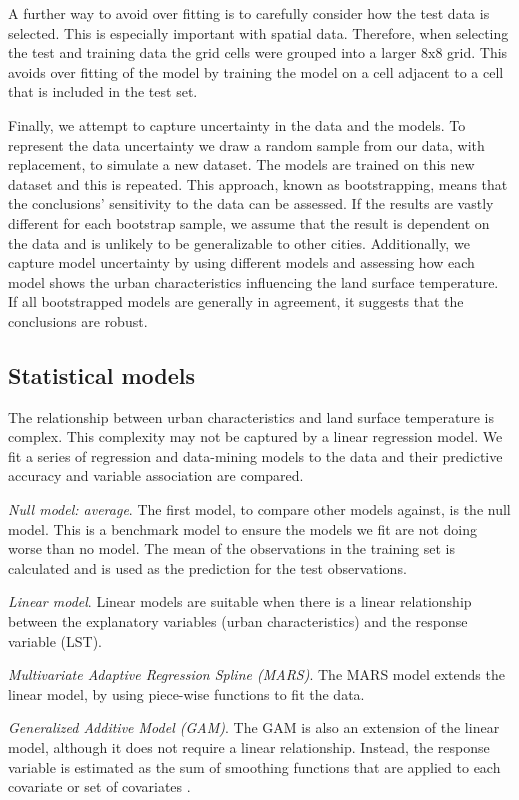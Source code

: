 \documentclass[final,3p,times,twocolumn,sort&compress]{elsarticle}
\begin{document}
A further way to avoid over fitting is to carefully consider how the test data is selected.
This is especially important with spatial data.
Therefore, when selecting the test and training data the grid cells were grouped into a larger 8x8 grid.
This avoids over fitting of the model by training the model on a cell adjacent to a cell that is included in the test set.

Finally, we attempt to capture uncertainty in the data and the models. 
To represent the data uncertainty we draw a random sample from our data, with replacement, to simulate a new dataset.
The models are trained on this new dataset and this is repeated.
This approach, known as bootstrapping, means that the conclusions' sensitivity to the data can be assessed.
If the results are vastly different for each bootstrap sample, we assume that the result is dependent on the data and is unlikely to be generalizable to other cities.
Additionally, we capture model uncertainty by using different models and assessing how each model shows the urban characteristics influencing the land surface temperature.
If all bootstrapped models are generally in agreement, it suggests that the conclusions are robust.


\subsection{Statistical models}
\label{ss:models}
The relationship between urban characteristics and land surface temperature is complex.
This complexity may not be captured by a linear regression model. 
We fit a series of regression and data-mining models to the data and their predictive accuracy and variable association are compared.

\textit{Null model: average}. The first model, to compare other models against, is the null model. 
This is a benchmark model to ensure the models we fit are not doing worse than no model.
The mean of the observations in the training set is calculated and is used as the prediction for the test observations.

\textit{Linear model}. Linear models are suitable when there is a linear relationship between the explanatory variables (urban characteristics) and the response variable (LST).

\textit{Multivariate Adaptive Regression Spline (MARS)}. The MARS model extends the linear model, by using piece-wise functions to fit the data. \cite{Friedman1991-of}

\textit{Generalized Additive Model (GAM)}. The GAM is also an extension of the linear model, although it does not require a linear relationship. Instead, the response variable is estimated as the sum of smoothing functions that are applied to each covariate or set of covariates \cite{Hastie1990-cg}.
\end{document}
